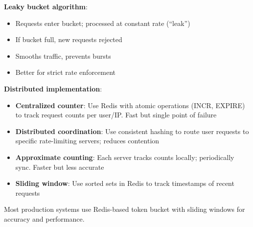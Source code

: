\documentclass[11pt]{article}
\begin{document}
\begin{enumerate}[label=\textbf{\arabic*.}]
  \textbf{Leaky bucket algorithm}:
  \begin{itemize}
    \item Requests enter bucket; processed at constant rate (``leak'')
    \item If bucket full, new requests rejected
    \item Smooths traffic, prevents bursts
    \item Better for strict rate enforcement
  \end{itemize}

  \textbf{Distributed implementation}:
  \begin{itemize}
    \item \textbf{Centralized counter}: Use Redis with atomic operations (INCR, EXPIRE) to track 
    request counts per user/IP. Fast but single point of failure
    \item \textbf{Distributed coordination}: Use consistent hashing to route user requests to 
    specific rate-limiting servers; reduces contention
    \item \textbf{Approximate counting}: Each server tracks counts locally; periodically sync. 
    Faster but less accurate
    \item \textbf{Sliding window}: Use sorted sets in Redis to track timestamps of recent requests
  \end{itemize}

  Most production systems use Redis-based token bucket with sliding windows for accuracy and performance.

\end{enumerate}
\end{document}
